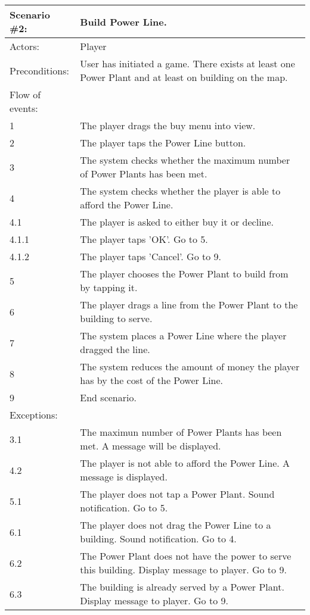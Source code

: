 \begin{tabular}{| l | p{10cm} |}
	\hline
	{\bf Scenario \#2:} & {\bf Build Power Line.} \\ \hline
	Actors: & Player \\ \hline
	Preconditions: & User has initiated a game. There exists at least one Power Plant and at least on building on the map. \\ \hline
	Flow of events: & \\ \hline
	1 & The player drags the buy menu into view. \\ \hline
	2 & The player taps the Power Line button. \\ \hline
	3 & The system checks whether the maximum number of Power Plants has been met. \\ \hline
	4 & The system checks whether the player is able to afford the Power Line. \\ \hline
	4.1 & The player is asked to either buy it or decline. \\ \hline
	4.1.1 & The player taps 'OK'. Go to 5. \\ \hline
	4.1.2 & The player taps 'Cancel'. Go to 9. \\ \hline
	5 & The player chooses the Power Plant to build from by tapping it. \\ \hline
	6 & The player drags a line from the Power Plant to the building to serve. \\ \hline
	7 & The system places a Power Line where the player dragged the line. \\ \hline
	8 & The system reduces the amount of money the player has by the cost of the Power Line. \\ \hline
	9 & End scenario. \\ \hline
	Exceptions: & \\ \hline
	3.1 & The maximun number of Power Plants has been met. A message will be displayed. \\ \hline
	4.2 & The player is not able to afford the Power Line. A message is displayed. \\ \hline
	5.1 & The player does not tap a Power Plant. Sound notification. Go to 5. \\ \hline
	6.1 & The player does not drag the Power Line to a building. Sound notification. Go to 4. \\ \hline
	6.2 & The Power Plant does not have the power to serve this building. Display message to player. Go to 9. \\ \hline
	6.3 & The building is already served by a Power Plant. Display message to player. Go to 9. \\ \hline
\end{tabular}

